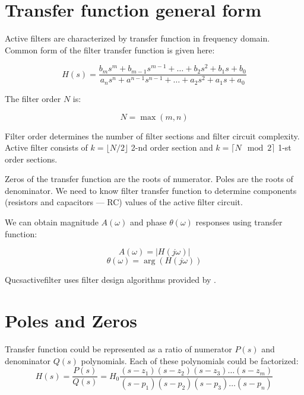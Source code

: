 \section{Transfer function general form}

Active filters are characterized by transfer function in frequency domain.
Common form of the filter transfer function is given here:

\begin{equation}
 H(s)=\frac{b_m s^m+b_{m-1}s^{m-1}+\ldots+b_2 s^2+b_1 s+b_0}
           {a_n s^n+a^{n-1}s^{n-1}+\ldots+a_2 s^2+a_1 s+a_0} \label{trfunc}
\end{equation}

The filter order $N$ is:

\begin{equation}
 N = \max(m,n)
\end{equation}

Filter order determines the number of filter sections and filter circuit
complexity. Active filter consists of $k=\lfloor N/2\rfloor$ 2-nd order section
and $k=\lceil N \mod 2 \rceil$ 1-st order sections. 

Zeros of the transfer function are the roots of numerator.  Poles are the roots
of denominator. We need to know filter transfer function to determine components
(resistors and capacitors --- RC) values of the active filter circuit.

We can obtain magnitude $A(\omega)$ and phase $\theta(\omega)$ responses  using
transfer function:

\begin{equation}
 A(\omega)=|H(j\omega)|
\end{equation}
\begin{equation}
 \theta(\omega)=\arg(H(j\omega))
\end{equation}



Qucsactivefilter uses filter design algorithms provided by \cite{johnson}.

\section{Poles and Zeros}

Transfer function could be represented as a ratio of numerator $P(s)$ and
denominator $Q(s)$ polynomials. Each of these polynomials could be factorized:
\begin{equation}
 H(s)=\frac{P(s)}{Q(s)}=H_0\frac{(s-z_1)(s-z_2)(s-z_3)\ldots(s-z_m)}
                                {(s-p_1)(s-p_2)(s-p_3)\ldots(s-p_n)}
\end{equation}

